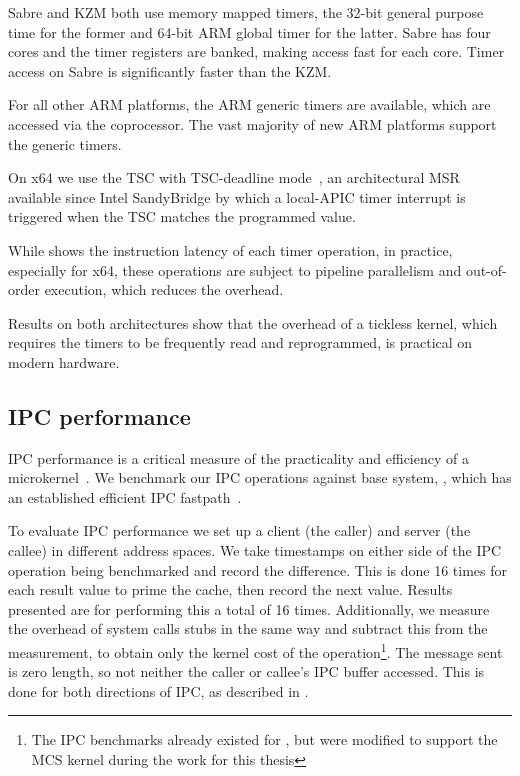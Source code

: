 Sabre and KZM both use memory mapped timers, the 32-bit general purpose time for the former and
64-bit ARM global timer for the latter. Sabre has four cores and the timer registers are banked,
making access fast for each core. Timer access on Sabre is significantly faster than the KZM. 

For all other ARM platforms, the ARM generic timers are available, which are accessed via the
coprocessor. The vast majority of new ARM platforms support the generic timers. 

On x64 we use the \gls{TSC} with \gls{TSC}-deadline mode~\citep{Intel_64_IA-32:asdmspg_325384}, an architectural \gls{MSR} available since
Intel SandyBridge by which a local-APIC timer interrupt is triggered when the \gls{TSC} matches the
programmed value. 

While  shows the instruction latency of each timer operation, in practice, especially
for x64, these operations are subject to pipeline parallelism and out-of-order execution, which
reduces the overhead.

Results on both architectures show that the overhead of a tickless kernel, which requires the timers
to be frequently read and reprogrammed, is practical on modern hardware.

\subsection{IPC performance}

\Gls{IPC} performance is a critical measure of the practicality and efficiency of a
microkernel~\citep{Liedtke_95}. We benchmark our \gls{IPC} operations against base system, \selfour,
which has an established efficient \gls{IPC} fastpath~\citep{Elphinstone_Heiser_13}. 

To evaluate IPC performance we set up a client (the caller) and server (the callee) in different
address spaces. We take
timestamps on either side of the IPC operation being benchmarked and record the difference. This is
done 16 times for each result value to prime the cache, then record the next value. Results
presented are for performing this a total of 16 times. Additionally, we measure the overhead of
system calls stubs in the same way and subtract this from the measurement, to obtain only the kernel
cost of the operation\footnote{The \gls{IPC} benchmarks already existed for \selfour, but were modified to
    support the \gls{MCS} kernel during the work for this thesis}. The message sent is zero length, so not
neither the caller or callee's \gls{IPC} buffer accessed.
This is done for both directions of IPC, as described in . 

